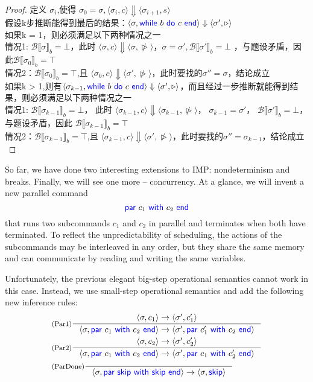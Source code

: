 \documentclass[11pt,a4paper]{article}
\let\sCont\triangleright
\let\sBreak\ntriangleright
\newcommand{\pair}[1]{\langle #1 \rangle}
\newcommand{\evalB}[2]{{\mathcal{B}\llbracket #1 \rrbracket}_{#2}}
\newcommand{\evalCsig}[4]{\pair{#1, #2} \Downarrow \pair{#3, #4}}
\newcommand{\evalCS}[4]{\pair{#1, #2} \rightarrow \pair{#3, #4}}
\newcommand{\kword}[1]{{\color{blue} \textsf{#1}}}
\newcommand{\Skip}{\kword{skip}}
\newcommand{\While}{\kword{while}}
\newcommand{\Do}{\kword{do}}
\newcommand{\End}{\kword{end}}
\newcommand{\Par}{\kword{par}}
\newcommand{\With}{\kword{with}}
\begin{document}
\begin{proof}
    定义 $\sigma_i$,使得 $\sigma_0 = \sigma,\evalCsig{\sigma_i}{c}{\sigma_{i+1}}{s}$ \\
    假设k步推断能得到最后的结果：$\evalCsig{\sigma}{\While~b~\Do~c~\End}{\sigma'}{\sCont}$\\
    如果k = 1，则必须满足以下两种情况之一\\
情况1: 
$\evalB{\sigma}{b}=\bot$，此时 $\evalCsig{\sigma}{c}{\sigma}{\sBreak}$，$ \sigma = \sigma', \evalB{\sigma'}{b}=\bot$
，与题设矛盾，因此$\evalB{\sigma_0}{b} = \top$\\
情况2：$\evalB{\sigma_0}{b} = \top$,且 $\evalCsig{\sigma_0}{c}{\sigma'}{\sBreak}$，此时要找的$\sigma'' = \sigma$，结论成立\\
如果k > 1,则有$\evalCsig{\sigma_{k - 1}}{\While~b~\Do~c~\End}{\sigma'}{\sCont}$，而且经过一步推断就能得到结果，则必须满足以下两种情况之一\\
情况1: 
$\evalB{\sigma_{k - 1}}{b} = \bot$，
此时 
$\evalCsig{\sigma_{k - 1}}{c}{\sigma_{k - 1}}{\sBreak}$， $\sigma_{k - 1} = \sigma'$， $\evalB{\sigma'}{b}=\bot$，与题设矛盾，因此
$\evalB{\sigma_{k - 1}}{b} = \top$\\
情况2：$\evalB{\sigma_{k - 1}}{b} = \top$,且 $\evalCsig{\sigma_{k - 1}}{c}{\sigma'}{\sBreak}$，此时要找的$\sigma'' = \sigma_{k - 1}$，结论成立\\
    
\end{proof}

\newpage
{}

So far, we have done two interesting extensions to IMP: nondeterminism and breaks.
Finally, we will see one more -- concurrency.
At a glance, we will invent a new parallel command $$\Par~c_1~\With~c_2~\End$$ that runs two subcommands $c_1$ and $c_2$ in parallel and terminates when both have terminated.
To reflect the unpredictability of scheduling, the actions of the subcommands may be interleaved in any order, but they share the same memory and can communicate by reading and writing the same variables.

Unfortunately, the previous elegant big-step operational semantics cannot work in this case.
Instead, we use small-step operational semantics and add the following new inference rules:
\begin{align*}
	& \inference[(Par1)]{\evalCS{\sigma}{c_1}{\sigma'}{c_1'}}
		{\evalCS{\sigma}{\Par~c_1~\With~c_2~\End}{\sigma'}{\Par~c_1'~\With~c_2~\End}} \\
	& \inference[(Par2)]{\evalCS{\sigma}{c_2}{\sigma'}{c_2'}}
		{\evalCS{\sigma}{\Par~c_1~\With~c_2~\End}{\sigma'}{\Par~c_1~\With~c_2'~\End}} \\
	& \inference[(ParDone)]{}{\evalCS{\sigma}{\Par~\Skip~\With~\Skip~\End}{\sigma}{\Skip}}
\end{align*}
\end{document}

